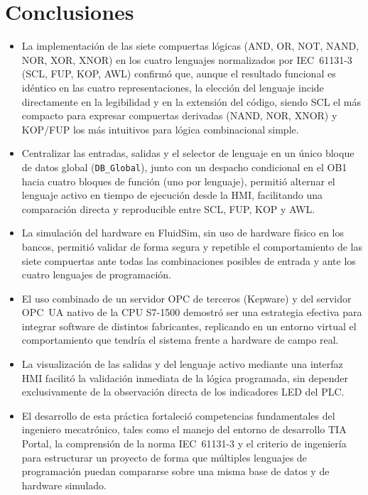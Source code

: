 \documentclass[conference]{IEEEtran}
\begin{document}
\section{Conclusiones}

\begin{itemize}
    \item La implementación de las siete compuertas lógicas (AND, OR, NOT, NAND, NOR, XOR, XNOR) en los cuatro lenguajes normalizados por IEC~61131-3 (SCL, FUP, KOP, AWL) confirmó que, aunque el resultado funcional es idéntico en las cuatro representaciones, la elección del lenguaje incide directamente en la legibilidad y en la extensión del código, siendo SCL el más compacto para expresar compuertas derivadas (NAND, NOR, XNOR) y KOP/FUP los más intuitivos para lógica combinacional simple.
    \item Centralizar las entradas, salidas y el selector de lenguaje en un único bloque de datos global (\texttt{DB\_Global}), junto con un despacho condicional en el OB1 hacia cuatro bloques de función (uno por lenguaje), permitió alternar el lenguaje activo en tiempo de ejecución desde la HMI, facilitando una comparación directa y reproducible entre SCL, FUP, KOP y AWL.
    \item La simulación del hardware en FluidSim\textregistered, sin uso de hardware físico en los bancos, permitió validar de forma segura y repetible el comportamiento de las siete compuertas ante todas las combinaciones posibles de entrada y ante los cuatro lenguajes de programación.
    \item El uso combinado de un servidor OPC de terceros (Kepware) y del servidor OPC~UA nativo de la CPU S7-1500 demostró ser una estrategia efectiva para integrar software de distintos fabricantes, replicando en un entorno virtual el comportamiento que tendría el sistema frente a hardware de campo real.
    \item La visualización de las salidas y del lenguaje activo mediante una interfaz HMI facilitó la validación inmediata de la lógica programada, sin depender exclusivamente de la observación directa de los indicadores LED del PLC.
    \item El desarrollo de esta práctica fortaleció competencias fundamentales del ingeniero mecatrónico, tales como el manejo del entorno de desarrollo TIA Portal\textregistered, la comprensión de la norma IEC~61131-3 y el criterio de ingeniería para estructurar un proyecto de forma que múltiples lenguajes de programación puedan compararse sobre una misma base de datos y de hardware simulado.
\end{itemize}
\end{document}

